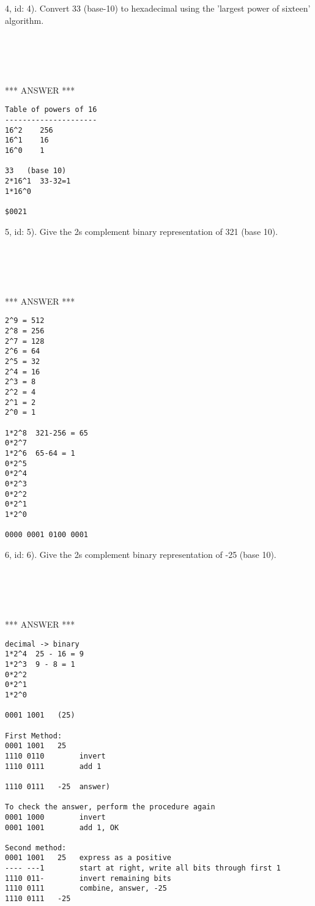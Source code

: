 \documentclass[fleqn]{article}
\begin{document}
4, id: 4).  Convert 33 (base-10) to hexadecimal using the 'largest power of sixteen' algorithm.
\begin{verbatim}





\end{verbatim}

*** ANSWER ***

\begin{verbatim}
Table of powers of 16
---------------------
16^2	256
16^1	16
16^0	1

33   (base 10)
2*16^1  33-32=1
1*16^0

$0021
\end{verbatim}

5, id: 5).  Give the 2s complement binary representation of 321 (base 10).
\begin{verbatim}





\end{verbatim}

*** ANSWER ***

\begin{verbatim}
2^9 = 512
2^8 = 256
2^7 = 128
2^6 = 64
2^5 = 32
2^4 = 16
2^3 = 8
2^2 = 4
2^1 = 2
2^0 = 1

1*2^8  321-256 = 65
0*2^7
1*2^6  65-64 = 1
0*2^5
0*2^4
0*2^3
0*2^2
0*2^1
1*2^0

0000 0001 0100 0001
\end{verbatim}

6, id: 6).  Give the 2s complement binary representation of -25 (base 10).
\begin{verbatim}





\end{verbatim}

*** ANSWER ***

\begin{verbatim}
decimal -> binary
1*2^4  25 - 16 = 9
1*2^3  9 - 8 = 1
0*2^2
0*2^1
1*2^0

0001 1001   (25)

First Method:
0001 1001   25
1110 0110        invert
1110 0111        add 1

1110 0111   -25  answer)

To check the answer, perform the procedure again
0001 1000        invert
0001 1001        add 1, OK

Second method:
0001 1001   25   express as a positive
---- ---1        start at right, write all bits through first 1
1110 011-        invert remaining bits
1110 0111        combine, answer, -25
1110 0111   -25
\end{verbatim}
\end{document}
